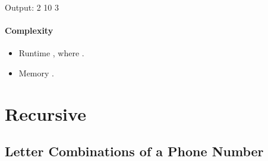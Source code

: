 \documentclass[letterpaper,12pt,english]{book}
\begin{document}
\begin{sphinxVerbatim}[commandchars=\\\{\}]
\end{sphinxVerbatim}

\begin{sphinxVerbatim}[commandchars=\\\{\}]
Output:
2
10
3
\end{sphinxVerbatim}


\subsubsection{Complexity}
\label{\detokenize{Binary_Search/540_Single_Element_in_a_Sorted_Array:id3}}\begin{itemize}
\item {} 
\sphinxAtStartPar
Runtime , where .

\item {} 
\sphinxAtStartPar
Memory .

\end{itemize}

\sphinxstepscope


\chapter{Recursive}
\label{\detokenize{Recursive/index:recursive}}\label{\detokenize{Recursive/index::doc}}
\sphinxstepscope


\section{Letter Combinations of a Phone Number}
\label{\detokenize{Recursive/17_Letter_Combinations_of_a_Phone_Number:letter-combinations-of-a-phone-number}}\label{\detokenize{Recursive/17_Letter_Combinations_of_a_Phone_Number::doc}}
\end{document}

